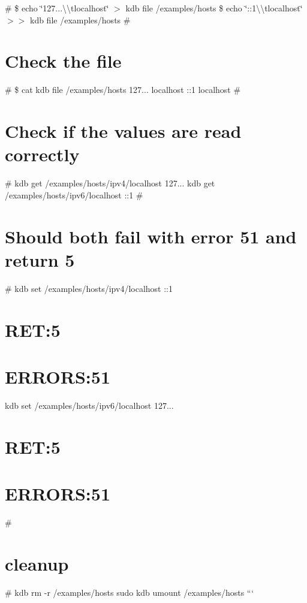 \# \$ echo \char`\"{}127...\textbackslash{}\textbackslash{}tlocalhost\char`\"{} $>$ {\ttfamily kdb file /examples/hosts} \$ echo \char`\"{}\+::1\textbackslash{}\textbackslash{}tlocalhost\char`\"{} $>$$>$ {\ttfamily kdb file /examples/hosts} \# \section*{Check the file}

\# \$ cat {\ttfamily kdb file /examples/hosts} 127... localhost \+:\+:1 localhost \# \section*{Check if the values are read correctly}

\# kdb get /examples/hosts/ipv4/localhost 127... kdb get /examples/hosts/ipv6/localhost \+:\+:1 \# \section*{Should both fail with error 51 and return 5}

\# kdb set /examples/hosts/ipv4/localhost \+:\+:1 \section*{R\+E\+T\+:5}

\section*{E\+R\+R\+O\+R\+S\+:51}

kdb set /examples/hosts/ipv6/localhost 127... \section*{R\+E\+T\+:5}

\section*{E\+R\+R\+O\+R\+S\+:51}

\# \section*{cleanup}

\# kdb rm -\/r /examples/hosts sudo kdb umount /examples/hosts ``` 